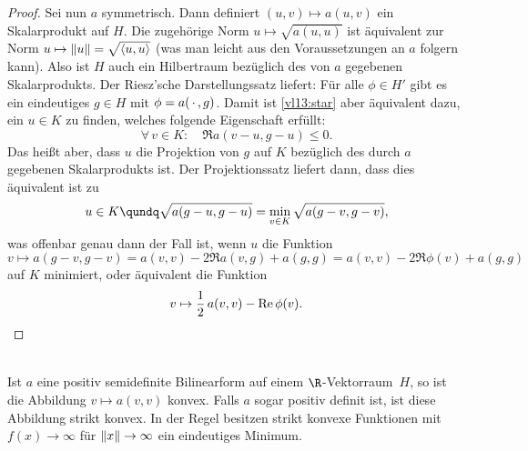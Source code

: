 \begin{proof}
    Sei nun $a$ symmetrisch. Dann definiert $(u,v)\mapsto a(u,v)$ ein
    Skalarprodukt auf $H$. Die zugehörige Norm $u\mapsto \sqrt{a(u,u)}$ ist
    äquivalent zur Norm $u\mapsto \norm{u} = \sqrt{\SP{u,u}}$ (was man leicht
    aus den Voraussetzungen an $a$ folgern kann).
    Also ist $H$ auch ein Hilbertraum bezüglich des von $a$ gegebenen
    Skalarprodukts. Der Riesz'sche Darstellungssatz  liefert:
    Für alle $\phi\in H'$ gibt es ein eindeutiges $g\in H$ mit 
    $\phi = a(\,\cdot\,,g)$. Damit ist \eqref{vl13:star} aber äquivalent dazu, ein
    $u\in K$ zu finden, welches folgende Eigenschaft erfüllt:
    \[ \forall\,v\in K\colon\quad
        \Re a(v-u,g-u) \leq 0
    . \]
    Das heißt aber, dass $u$ die Projektion von $g$ auf $K$ bezüglich des durch
    $a$ gegebenen Skalarprodukts ist. Der Projektionssatz
     liefert dann, dass dies äquivalent ist zu
    \[ u\in K \qundq \sqrt{a(g-u,g-u)} = \min_{v\in K} \sqrt{ a(g-v,g-v) }
    , \]
    was offenbar genau dann der Fall ist, wenn $u$ die Funktion
    \[ v \mapsto a(g-v,g-v) = a(v,v) - 2\Re a(v,g) + a(g,g) 
            = a(v,v) - 2\Re\phi(v) + a(g,g)
    \]
    auf $K$ minimiert, oder äquivalent die Funktion
    \[ v \mapsto \frac{1}{2}\, a(v,v) - \operatorname{Re}\phi(v) . \]
\end{proof}

\nnBemerkung\\
Ist $a$ eine positiv semidefinite Bilinearform auf einem $\R$-Vektorraum~$H$, so
ist die Abbildung $v\mapsto a(v,v)$ konvex. Falls $a$ sogar positiv definit ist,
ist diese Abbildung  strikt konvex. In der Regel besitzen strikt konvexe
Funktionen mit $f(x)\to\infty$ für $\lVert x\rVert\to\infty$ ein eindeutiges Minimum.
